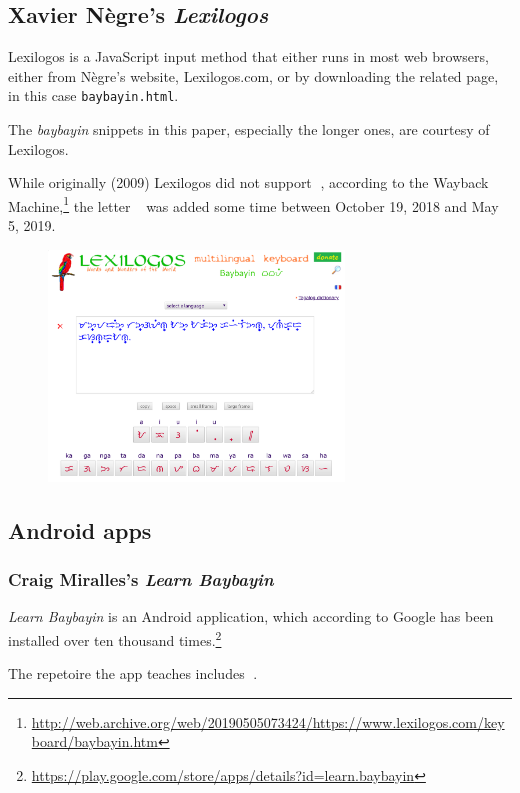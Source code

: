 \documentclass[a4paper,pagesize,openany,14pt,parskip=never]{scrbook}
\newcommand{\≈}{$\approx$}
\newcommand{\ra}{{\baybayin ᜍ}}
\begin{document}
\newpage
\subsection{Xavier Nègre's {\em Lexilogos}}

Lexilogos is a JavaScript input method that either runs in most web browsers, either from Nègre's website, Lexilogos.com, or by downloading the related page, in this case \texttt{baybayin.html}.

The {\em baybayin} snippets in this paper, especially the longer ones, are courtesy of Lexilogos.

While originally (2009) Lexilogos did not support \ra, according to the Wayback Machine,\footnote{\url{http://web.archive.org/web/20190505073424/https://www.lexilogos.com/keyboard/baybayin.htm}} the letter \ra\ was added some time between October 19, 2018 and May 5, 2019.

\begin{figure}[H]
\includegraphics[width=0.7\textwidth]{Lexilogos}
\end{figure}

\newpage
\subsection{Android apps}
\subsubsection{Craig Miralles's {\em Learn Baybayin}}

{\em Learn Baybayin} is an Android application, which according to Google has been installed over ten thousand times.\footnote{\url{https://play.google.com/store/apps/details?id=learn.baybayin}}

The repetoire the app teaches includes \ra.
\end{document}
